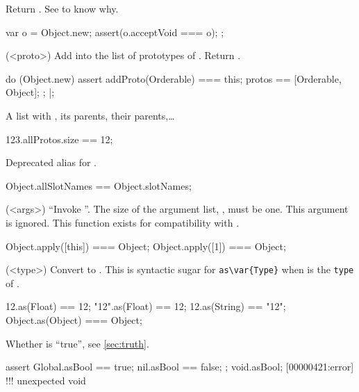 \begin{urbiscriptapi}
\item[acceptVoid]
  Return \this.  See  to know why.
\begin{urbiscript}
{
  var o = Object.new;
  assert(o.acceptVoid === o);
};
\end{urbiscript}


\item[addProto](<proto>)%
  Add  into the list of prototypes of \this.  Return \this.
\begin{urbiscript}
do (Object.new)
{
  assert
  {
    addProto(Orderable) === this;
    protos == [Orderable, Object];
  };
}|;
\end{urbiscript}

\item[allProto]%
  A list with \this, its parents, their parents,\ldots
\begin{urbiassert}
123.allProtos.size == 12;
\end{urbiassert}

\item[allSlotNames]
  Deprecated alias for .
\begin{urbiassert}
Object.allSlotNames == Object.slotNames;
\end{urbiassert}

\item[apply](<args>)%
  ``Invoke \this''.  The size of the argument list,
  , must be one.  This argument is ignored.  This function
  exists for compatibility with .
\begin{urbiassert}
Object.apply([this]) === Object;
Object.apply([1])    === Object;
\end{urbiassert}

\item[as](<type>)%
  Convert \this to .  This is syntactic sugar for
  \lstinline|as\var{Type}| when  is the \lstinline|type| of
  .
\begin{urbiassert}
     12.as(Float) == 12;
   "12".as(Float) == 12;
    12.as(String) == "12";
Object.as(Object) === Object;
\end{urbiassert}

\item[asBool]
  Whether \this is ``true'', see \autoref{sec:truth}.
\begin{urbiscript}
assert
{
  Global.asBool == true;
  nil.asBool ==    false;
};
void.asBool;
[00000421:error] !!! unexpected void
\end{urbiscript}


\end{urbiscriptapi}
